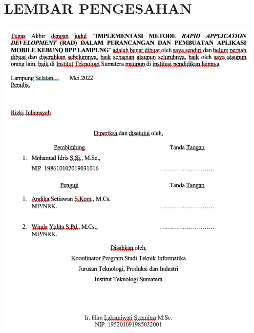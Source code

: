 %
\chapter*{\uppercase{LEMBAR PENGESAHAN}}
\centering
\includegraphics[width=15cm]{images/pengesahan.png}\\
                    


